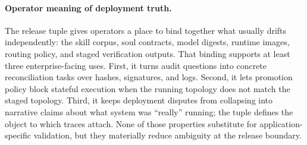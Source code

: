 \documentclass[11pt]{article}
\theoremstyle{remark}
\begin{document}
\paragraph{Operator meaning of deployment truth.}
The release tuple gives operators a place to bind together what usually drifts independently: the skill corpus, soul contracts, model digests, runtime images, routing policy, and staged verification outputs. That binding supports at least three enterprise-facing uses. First, it turns audit questions into concrete reconciliation tasks over hashes, signatures, and logs. Second, it lets promotion policy block stateful execution when the running topology does not match the staged topology. Third, it keeps deployment disputes from collapsing into narrative claims about what system was ``really'' running; the tuple defines the object to which traces attach. None of those properties substitute for application-specific validation, but they materially reduce ambiguity at the release boundary.
\end{document}
